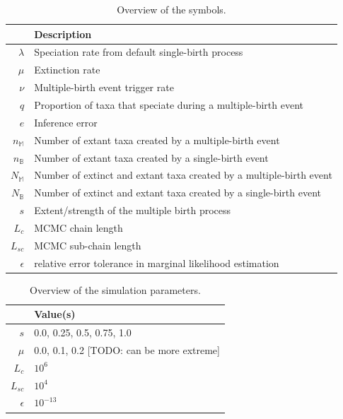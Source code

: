 \documentclass{article}
\begin{document}
\begin{table}
  \centering 
  \begin{tabular}{r l}
    \hline
                          & Description\\
    \hline
    \hline
    $\lambda$             & Speciation rate from default single-birth process \\
    $\mu$                 & Extinction rate \\
    $\nu$                 & Multiple-birth event trigger rate \\
    $q$                   & Proportion of taxa that speciate during a multiple-birth event \\
    $e$                   & Inference error \\
    $n_{\mathbb{M}}$      & Number of extant taxa created by a multiple-birth event \\
    $n_{\mathbb{B}}$      & Number of extant taxa created by a single-birth event \\
    $N_{\mathbb{M}}$      & Number of extinct and extant taxa created by a multiple-birth event \\
    $N_{\mathbb{B}}$      & Number of extinct and extant taxa created by a single-birth event \\
    $s$                   & Extent/strength of the multiple birth process \\
    $L_c$                 & MCMC chain length \\
    $L_{sc}$              & MCMC sub-chain length \\
    $\epsilon$            & relative error tolerance in marginal likelihood estimation \\
    \hline
  \end{tabular}
  \caption{
    Overview of the symbols. 
  }
  \label{table:symbols}
\end{table}

\begin{table}
  \centering 
  \begin{tabular}{r l}
    \hline
                          & Value(s) \\
    \hline
    \hline
    $s$                   & 0.0, 0.25, 0.5, 0.75, 1.0 \\
    $\mu$                 & 0.0, 0.1, 0.2 [TODO: can be more extreme] \\
    $L_c$                 & $10^6$ \\
    $L_{sc}$              & $10^4$ \\
    $\epsilon$            & $10^{-13}$ \\
    \hline
  \end{tabular}
  \caption{
    Overview of the simulation parameters. 
  }
  \label{table:parameters}
\end{table}
\end{document}

